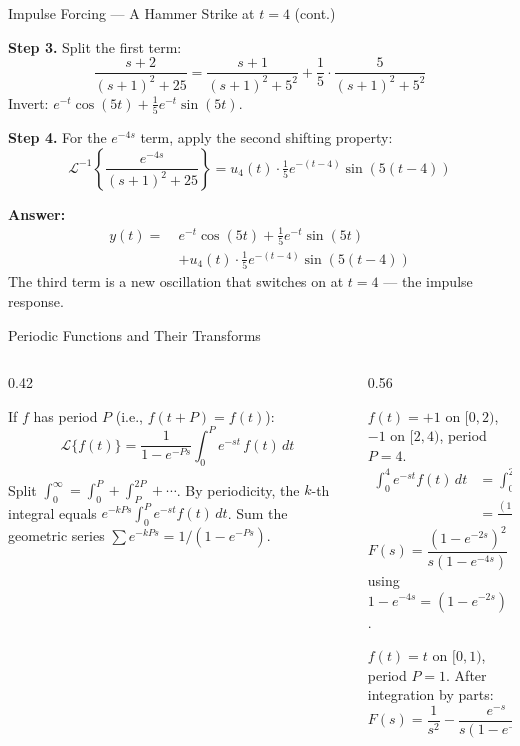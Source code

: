 \documentclass[aspectratio=169,11pt]{beamer}
\begin{document}
\begin{frame}{Impulse Forcing --- A Hammer Strike at $t=4$ (cont.)}
\footnotesize
\begin{examplebox}[Damped Oscillator Struck at $t=4$ (cont.)]
\textbf{Step 3.} Split the first term:
\[\frac{s+2}{(s+1)^2+25} = \frac{s+1}{(s+1)^2+5^2} + \frac{1}{5}\cdot\frac{5}{(s+1)^2+5^2}\]
Invert: $e^{-t}\cos(5t) + \tfrac{1}{5}e^{-t}\sin(5t)$.

\textbf{Step 4.} For the $e^{-4s}$ term, apply the second shifting property:
\[\mathcal{L}^{-1}\!\left\{\frac{e^{-4s}}{(s+1)^2+25}\right\} = u_4(t)\cdot\tfrac{1}{5}e^{-(t-4)}\sin(5(t-4))\]

\textbf{Answer:}
\begin{align*}
y(t) =\ & e^{-t}\cos(5t) + \tfrac{1}{5}e^{-t}\sin(5t) \\
& + u_4(t)\cdot\tfrac{1}{5}e^{-(t-4)}\sin(5(t-4))
\end{align*}
The third term is a new oscillation that switches on at $t=4$ --- the impulse response.
\end{examplebox}
\end{frame}

\begin{frame}{Periodic Functions and Their Transforms}
\footnotesize
\begin{columns}[T]
\begin{column}{0.42\textwidth}
\begin{formulabox}
If $f$ has period $P$ (i.e., $f(t+P) = f(t)$):
\[\mathcal{L}\{f(t)\} = \frac{1}{1 - e^{-Ps}} \int_0^P e^{-st}\, f(t)\, dt\]
\end{formulabox}
\vspace{0.5mm}
\begin{methodbox}
Split $\int_0^{\infty} = \int_0^P + \int_P^{2P} + \cdots$. By periodicity, the $k$-th integral equals $e^{-kPs}\!\int_0^P\! e^{-st}f(t)\,dt$. Sum the geometric series $\sum e^{-kPs} = 1/(1-e^{-Ps})$.
\end{methodbox}
\end{column}
\begin{column}{0.56\textwidth}
\begin{examplebox}
$f(t) = +1$ on $[0,2)$, $-1$ on $[2,4)$, period $P=4$.
\begin{align*}
\int_0^4 e^{-st}f(t)\,dt &= \int_0^2\! e^{-st}dt - \int_2^4\! e^{-st}dt \\
&= \frac{(1-e^{-2s})^2}{s}
\end{align*}
\[F(s) = \frac{(1-e^{-2s})^2}{s(1-e^{-4s})} = \frac{1-e^{-2s}}{s(1+e^{-2s})}\]
using $1-e^{-4s} = (1-e^{-2s})(1+e^{-2s})$.
\end{examplebox}
\vspace{0.5mm}
\begin{examplebox}
$f(t) = t$ on $[0,1)$, period $P=1$. After integration by parts:
\[F(s) = \frac{1}{s^2} - \frac{e^{-s}}{s(1-e^{-s})}\]
\end{examplebox}
\end{column}
\end{columns}
\end{frame}
\end{document}

